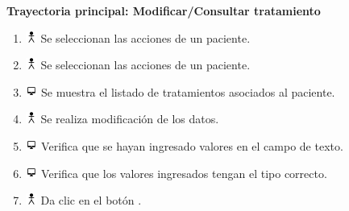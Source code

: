 \textbf{Trayectoria principal: Modificar/Consultar tratamiento}        
\begin{enumerate}
\item \includegraphics[height=1em]{pictures/actor.png} Se seleccionan las acciones de un paciente.
\item \includegraphics[height=1em]{pictures/actor.png} Se seleccionan las acciones de un paciente.
\item \includegraphics[height=1em]{pictures/sistema.png} Se muestra el listado de tratamientos asociados al paciente.
\item \includegraphics[height=1em]{pictures/actor.png} Se realiza modificación de los datos.
\item \includegraphics[height=1em]{pictures/sistema.png} Verifica que se hayan ingresado valores en el campo de texto.
\item \includegraphics[height=1em]{pictures/sistema.png} Verifica que los valores ingresados tengan el tipo correcto.
\item \includegraphics[height=1em]{pictures/actor.png} Da clic en el botón .
\end{enumerate} \bigskip

